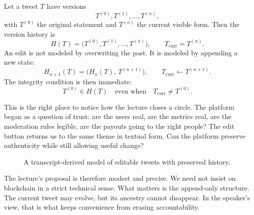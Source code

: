 Let a tweet \(T\) have versions
\[
T^{(0)}, T^{(1)}, \dots, T^{(n)},
\]
with \(T^{(0)}\) the original statement and \(T^{(n)}\) the current visible form. Then the version history is
\begin{equation}
H(T) = \bigl(T^{(0)}, T^{(1)}, \dots, T^{(n)}\bigr),
\qquad
T_{\mathrm{curr}} = T^{(n)}.
\end{equation}
An edit is not modeled by overwriting the past. It is modeled by appending a new state:
\begin{equation}
H_{n+1}(T) = \bigl(H_n(T),\, T^{(n+1)}\bigr),
\qquad
T_{\mathrm{curr}} \leftarrow T^{(n+1)}.
\end{equation}
The integrity condition is then immediate:
\begin{equation}
T^{(0)} \in H(T)
\quad \text{even when} \quad
T_{\mathrm{curr}} \neq T^{(0)}.
\end{equation}

This is the right place to notice how the lecture closes a circle. The platform began as a question of trust: are the users real, are the metrics real, are the moderation rules legible, are the payouts going to the right people? The edit button returns us to the same theme in textual form. Can the platform preserve authenticity while still allowing useful change?

\begin{figure}[h]
\centering
{}
\caption{A transcript-derived model of editable tweets with preserved history.}
\end{figure}

The lecture's proposal is therefore modest and precise. We need not insist on blockchain in a strict technical sense. What matters is the append-only structure. The current tweet may evolve, but its ancestry cannot disappear. In the speaker's view, that is what keeps convenience from erasing accountability.

